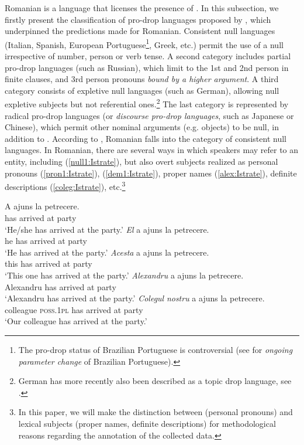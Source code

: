 \documentclass[output=paper,colorlinks,citecolor=brown]{langscibook}
\begin{document}
Romanian is a language that licenses the presence of  \citep{dobrovie2013reference}. In this subsection, we firstly present the classification of pro-drop languages proposed by
 \citet{holmberg2010null}, which underpinned the predictions made for Romanian. Consistent null  languages (Italian, Spanish, European Portuguese\footnote{The pro-drop status of Brazilian Portuguese is controversial (see \citealt{duarte1996perda, duarte2000loss} for \textit{ongoing parameter change} of Brazilian Portuguese).}, Greek, etc.) permit the use of a null  irrespective of number, person or verb tense. A second category includes partial pro-drop languages (such as Russian), which limit  to the 1st and 2nd person in finite clauses, and 3rd person pronouns \textit{bound by a higher argument}. A third category consists of expletive null  languages (such as German), allowing null expletive subjects but not referential ones.\footnote{German has more recently also been described as a topic drop language, see \citet{Schäfer2021}.} The last category is represented by radical pro-drop languages (or \textit{discourse pro-drop languages}, such as Japanese or Chinese), which permit other nominal arguments (e.g. objects) to be null, in addition to .  
According to \citet{holmberg2010null}, Romanian falls into the category of consistent null  languages. In Romanian, there are several ways in which speakers may refer to an entity, including  (\ref{null1:Istrate}), but also overt subjects realized as personal pronouns (\ref{pron1:Istrate}),  (\ref{dem1:Istrate}), proper names (\ref{alex:Istrate}), definite descriptions (\ref{coleg:Istrate}), etc.\footnote{In this paper, we will make the distinction between  (personal pronouns) and lexical subjects (proper names, definite descriptions) for methodological reasons regarding the annotation of the collected data.}

\ea \ea \label{null1:Istrate}
\gll A ajuns la petrecere. \\ 
has arrived at party\\
\glt`He/she has arrived at the party.'    
\ex \label{pron1:Istrate}
\gll \textit{El} a ajuns la petrecere.\\ 
he has arrived at party\\
\glt `He has arrived at the party.' 
\ex \label{dem1:Istrate}
\gll \textit{Acesta} a ajuns la petrecere.\\ 
this has arrived at party\\
\glt `This one has arrived at the party.' 
\ex \label{alex:Istrate}
\gll \textit{Alexandru} a ajuns la petrecere.\\ 
Alexandru has arrived at party\\
\glt `Alexandru has arrived at the party.'
\ex \label{coleg:Istrate}
\gll \textit{Colegul} \textit{nostru} a ajuns la petrecere.\\ 
colleague \textsc{poss.1pl} has arrived at party\\
\glt `Our colleague has arrived at the party.'
\z
\z
\end{document}
